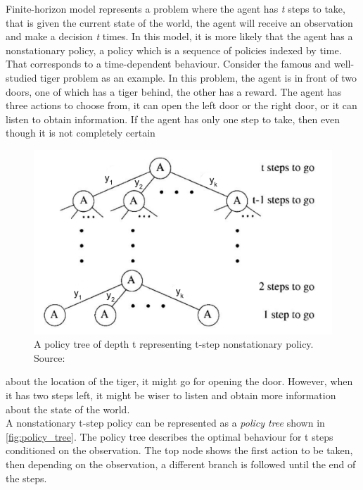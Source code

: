 Finite-horizon model represents a problem where the agent has \textit{t} steps to take, that is given the current state of the world, the agent will receive an observation and make a decision \textit{t} times. In this model, it is more likely that the agent has a nonstationary policy, a policy which is a sequence of policies indexed by time. That corresponds to a time-dependent behaviour. Consider the famous and well-studied tiger problem as an example. In this problem, the agent is in front of two doors, one of which has a tiger behind, the other has a reward. The agent has three actions to choose from, it can open the left door or the right door, or it can listen to obtain information. If the agent has only one step to take, then even though it is not completely certain
\begin{figure}
	\begin{center}
		\includegraphics[width=1\linewidth]{figures/policy_tree}
		\caption[A policy tree]{A policy tree of depth t representing t-step nonstationary policy. Source: \cite{KAELBLING199899}}
		\label{fig:policy_tree}
	\end{center}
	\vspace{-40pt}
\end{figure} 
about the location of the tiger, it might go for opening the door. However, when it has two steps left, it might be wiser to listen and obtain more information about the state of the world.\\
A nonstationary t-step policy can be represented as a \textit{policy tree} shown in \autoref{fig:policy_tree}. The policy tree describes the optimal behaviour for t steps conditioned on the observation. The top node shows the first action to be taken, then depending on the observation, a different branch is followed until the end of the steps. \\\\

